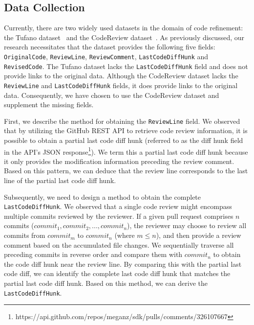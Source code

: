 \subsection{Data Collection}

Currently, there are two widely used datasets in the domain of code refinement: the Tufano dataset~\cite{tufano2019learning} and the CodeReview dataset~\cite{li2022automating}. As previously discussed, our research necessitates that the dataset provides the following five fields: \texttt{OriginalCode}, \texttt{ReviewLine}, \texttt{ReviewComment}, \texttt{LastCodeDiffHunk} and \texttt{RevisedCode}. The Tufano dataset lacks the \texttt{LastCodeDiffHunk} field and does not provide links to the original data. Although the CodeReview dataset lacks the \texttt{ReviewLine} and \texttt{LastCodeDiffHunk} fields, it does provide links to the original data. Consequently, we have chosen to use the CodeReview dataset and supplement the missing fields.

First, we describe the method for obtaining the \texttt{ReviewLine} field. We observed that by utilizing the GitHub REST API to retrieve code review information, it is possible to obtain a partial last code diff hunk (referred to as the diff hunk field in the API's JSON response\footnote{https://api.github.com/repos/meganz/sdk/pulls/comments/326107667}). We term this a partial last code diff hunk because it only provides the modification information preceding the review comment. 
Based on this pattern, we can deduce that the review line corresponds to the last line of the partial last code diff hunk.

Subsequently, we need to design a method to obtain the complete \texttt{LastCodeDiffHunk}. We observed that a single code review might encompass multiple commits reviewed by the reviewer. If a given pull request comprises \(n\) commits (\(commit_1, commit_2, ..., commit_n\)), the reviewer may choose to review all commits from \(commit_m\) to \(commit_n\) (where \(m \leq n\)), and then provide a review comment based on the accumulated file changes. 
We sequentially traverse all preceding commits in reverse order and compare them with \(commit_n\) to obtain the code diff hunk near the review line. By comparing this with the partial last code diff, we can identify the complete last code diff hunk that matches the partial last code diff hunk. Based on this method, we can derive the \texttt{LastCodeDiffHunk}.

